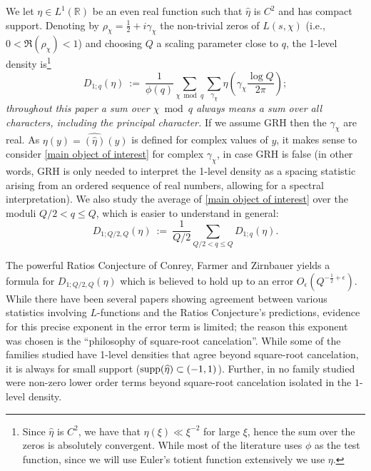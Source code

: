 \documentclass[12pt,reqno]{amsart}
\numberwithin{equation}{section}
\theoremstyle{plain}
\begin{document}
We let $\eta\in  L^1(\mathbb R)$ be an even real function such that ${\widehat{\eta}}$ is $C^2$ and has compact support. Denoting by $\rho_{\chi}=\frac 12+i\gamma_{\chi}$ the non-trivial zeros of $L(s,\chi)$ (i.e., $0<\Re (\rho_{\chi})<1$) and choosing $Q$ a scaling parameter close to $q$,  the 1-level density is\footnote{Since $\widehat \eta$ is $C^2$, we have that $\eta(\xi)\ll \xi^{-2}$ for large $\xi$, hence the sum over the zeros is absolutely convergent. While most of the literature uses $\phi$ as the test function, since we will use Euler's totient function extensively we use $\eta$.}
\begin{equation}\label{main object of interest} D_{1;q}(\eta) \ := \ \frac 1{\phi(q)}\sum_{\chi \bmod q} \sum_{\gamma_{\chi}} \eta\left(\gamma_{\chi} \frac{\log Q}{2\pi} \right);
\end{equation} \emph{throughout this paper a sum over $\chi \bmod q$ always means a sum over all characters, including the principal character.} If we assume GRH then the $\gamma_{\chi}$ are real. As $\eta(y) = \widehat{(\hat\eta)}(y)$ is defined for complex values of $y$, it makes sense to consider \eqref{main object of interest} for complex $\gamma_{\chi}$, in case GRH is false (in other words, GRH is only needed to interpret the 1-level density as a spacing statistic arising from an ordered sequence of real numbers, allowing for a spectral interpretation). We also study the average of \eqref{main object of interest} over the moduli $Q/2<q\leq Q$, which is easier to understand in general: \begin{equation}\label{eq:onelevelD1QhalvesQ} D_{1;Q/2,Q}(\eta) \ := \ \frac1{Q/2} \sum_{Q/2 < q \le Q} D_{1;q}(\eta). \end{equation}

The powerful Ratios Conjecture of Conrey, Farmer and Zirnbauer \cite{CFZ1,CFZ2} yields a formula for $D_{1;Q/2,Q}(\eta)$ which is believed to hold up to an error $O_{\epsilon}(Q^{-\frac 12+\epsilon})$. While there have been several papers \cite{CS1,CS2,DHP,GJMMNPP,HMM,Mil3,Mil4,MilMo} showing agreement between various statistics involving $L$-functions and the Ratios Conjecture's predictions, evidence for this precise exponent in the error term is limited; the reason this exponent was chosen is the ``philosophy of square-root cancelation''. While some of the families studied have 1-level densities that agree beyond square-root cancelation, it is always for small support (${\rm supp}(\widehat{\eta}) \subset (-1,1)$). Further, in no family studied were non-zero lower order terms beyond square-root cancelation isolated in the $1$-level density.
\end{document}
